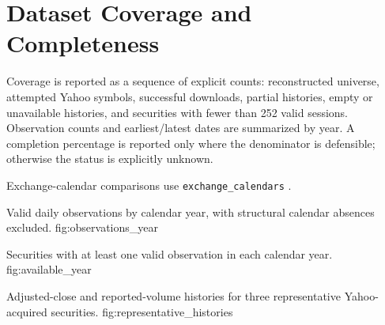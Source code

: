 \section{Dataset Coverage and Completeness}

Coverage is reported as a sequence of explicit counts: reconstructed universe,
attempted Yahoo symbols, successful downloads, partial histories, empty or
unavailable histories, and securities with fewer than 252 valid sessions.
Observation counts and earliest/latest dates are summarized by year. A
completion percentage is reported only where the denominator is defensible;
otherwise the status is explicitly unknown.

Exchange-calendar comparisons use \texttt{exchange\_calendars}
\citep{excal,nyse}.



  {Valid daily observations by calendar year, with structural calendar absences excluded.}
  {fig:observations_year}

  {Securities with at least one valid observation in each calendar year.}
  {fig:available_year}

  {Adjusted-close and reported-volume histories for three representative Yahoo-acquired securities.}
  {fig:representative_histories}
